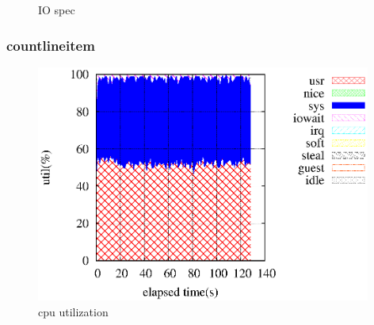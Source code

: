 \documentclass[11pt,a4paper]{jsarticle}
\newlength{\subfigwidth}
\newlength{\subfigcolsep}
\begin{document}
\begin{figure}[thbp]
 \setlength{\subfigwidth}{.5\linewidth}
 \addtolength{\subfigwidth}{-.5\subfigcolsep}
 \begin{minipage}[b]{\subfigwidth}
 \end{minipage}
  \begin{minipage}[b]{\subfigwidth}
  \end{minipage}
  \caption{IO spec}
  \label{fig:5}
\end{figure}

\clearpage
\subsubsection*{countlineitem}
\begin{figure}[thbp]
 \begin{center}
  \includegraphics[width=110mm]{vms0countlineitemcore1.eps}
 \end{center}
 \caption{cpu utilization}
 \label{fig:6cpu}
\end{figure}
\end{document}
